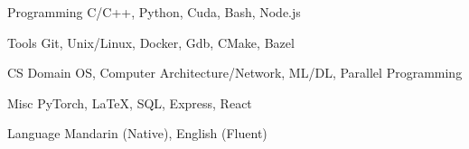

\begin{cvskills}

  \cvskill
    {Programming} %
    {C/C++, Python, Cuda, Bash, Node.js} %

  \cvskill
    {Tools} %
    {Git, Unix/Linux, Docker, Gdb, CMake, Bazel} %

  \cvskill
    {CS Domain} %
    {OS, Computer Architecture/Network, ML/DL, Parallel Programming} %

  \cvskill
    {Misc} %
    {PyTorch, LaTeX, SQL, Express, React} %

  \cvskill
    {Language} %
    {Mandarin (Native), English (Fluent)} %
\end{cvskills}
